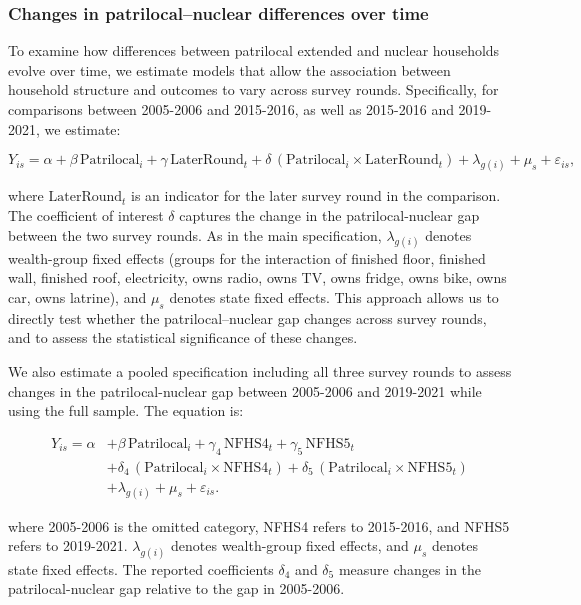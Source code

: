 \documentclass[12pt]{article}
\begin{document}
\subsubsection{Changes in patrilocal–nuclear differences over time}

To examine how differences between patrilocal extended and nuclear households evolve over time, we estimate models that allow the association between household structure and outcomes to vary across survey rounds. Specifically, for comparisons between 2005-2006 and 2015-2016, as well as 2015-2016 and 2019-2021, we estimate:

\begin{equation} \label{eq:tworounds}
Y_{is} = \alpha + \beta \,\text{Patrilocal}_i + \gamma \,\text{LaterRound}_t
+ \delta \,(\text{Patrilocal}_i \times \text{LaterRound}_t)
+ \lambda_{g(i)} + \mu_s + \varepsilon_{is},
\end{equation}


where $\text{LaterRound}_t$ is an indicator for the later survey round in the comparison. The coefficient of interest $\delta$ captures the change in the patrilocal-nuclear gap between the two survey rounds. As in the main specification, $\lambda_{g(i)}$ denotes wealth-group fixed effects (groups for the interaction of finished floor, finished wall, finished roof, electricity, owns radio, owns TV, owns fridge, owns bike, owns car, owns latrine), and $\mu_s$ denotes state fixed effects. This approach allows us to directly test whether the patrilocal–nuclear gap changes across survey rounds, and to assess the statistical significance of these changes.

We also estimate a pooled specification including all three survey rounds to assess changes in the patrilocal-nuclear gap between 2005-2006 and 2019-2021 while using the full sample. The equation is:

\begin{equation} \label{eq:stacked}
\begin{aligned}
Y_{is} = \alpha 
&+ \beta \,\text{Patrilocal}_i
+ \gamma_4 \,\text{NFHS4}_t
+ \gamma_5 \,\text{NFHS5}_t \\
&+ \delta_4 \,(\text{Patrilocal}_i \times \text{NFHS4}_t)
+ \delta_5 \,(\text{Patrilocal}_i \times \text{NFHS5}_t) \\
&+ \lambda_{g(i)} + \mu_s + \varepsilon_{is}.
\end{aligned}
\label{eq:controls_stacked}
\end{equation}

where 2005-2006 is the omitted category, NFHS4 refers to 2015-2016, and NFHS5 refers to 2019-2021. $\lambda_{g(i)}$ denotes wealth-group fixed effects, and $\mu_s$ denotes state fixed effects. The reported coefficients $\delta_4$ and $\delta_5$ measure changes in the patrilocal-nuclear gap relative to the gap in 2005-2006.
\end{document}

